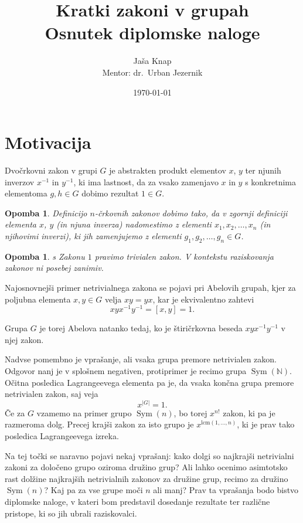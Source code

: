 \documentclass[12pt,a4paper]{article}
\title{Kratki zakoni v grupah \\ \large Osnutek diplomske naloge}
\author{Jaša Knap \\ \large Mentor: dr.~Urban Jezernik}
\date{\today}
\newcounter{theoremcounter}[section] %
\newtheorem{opomba}[theoremcounter]{Opomba}
\begin{document}
\maketitle

\section{Motivacija}

Dvočrkovni zakon v grupi $G$ je abstrakten produkt elementov $x$, $y$ ter njunih inverzov $x^{-1}$ in $y^{-1}$, ki ima lastnost, da za vsako zamenjavo $x$ in $y$ s konkretnima
elementoma $g, h \in G$ dobimo rezultat $1 \in G$. 

\begin{opomba}
Definicijo $n$-črkovnih zakonov dobimo tako, da v zgornji definiciji elementa $x$, $y$ (in njuna inverza) nadomestimo z elementi $x_1, x_2, \ldots, x_n$ (in njihovimi inverzi),
ki jih zamenjujemo z elementi $g_1, g_2, \ldots, g_{n} \in G$.
\end{opomba}

\begin{opomba}s
Zakonu $1$ pravimo trivialen zakon. V kontekstu raziskovanja zakonov ni posebej zanimiv.
\end{opomba}


\noindent
Najosnovnejši primer netrivialnega zakona se pojavi pri Abelovih grupah, kjer za poljubna elementa $x,y \in  G$ velja $xy = yx$, kar je ekvivalentno
zahtevi \begin{equation*}
xyx^{-1}y^{-1} = [x,y] = 1.
\end{equation*}


\noindent
Grupa $G$ je torej Abelova natanko tedaj, ko je štiričrkovna beseda $xyx^{-1}y^{-1}$ v njej zakon. 

\noindent
Nadvse pomembno je vprašanje, ali vsaka grupa premore netrivialen zakon. Odgovor nanj je v splošnem negativen, protiprimer je recimo grupa $\operatorname{Sym}(\mathbb{N})$.
Očitna posledica Lagrangeevega elementa pa je, da vsaka končna grupa premore netrivialen zakon, saj veja \begin{equation*}
x^{\lvert G \rvert } = 1.
\end{equation*}  
Če za $G$ vzamemo na primer grupo $\operatorname{Sym}(n)$, bo torej $x^{n!}$ zakon, ki pa je razmeroma dolg. Precej krajši zakon za isto grupo je $x^{\text{lcm}(1, \ldots, n)}$, ki je prav tako posledica Lagrangeevega izreka. 

\noindent
Na tej točki se naravno pojavi nekaj vprašanj:
kako dolgi so najkrajši netrivialni zakoni za določeno grupo oziroma družino grup? Ali lahko ocenimo asimtotsko rast dolžine najkrajših netrivialnih zakonov za družine grup, recimo za družino $\operatorname{Sym}(n)$? Kaj pa za vse grupe moči $n$ ali manj?  Prav ta vprašanja bodo bistvo diplomske naloge,
v kateri bom predstavil dosedanje rezultate ter različne pristope, ki so jih ubrali raziskovalci.
\end{document}
